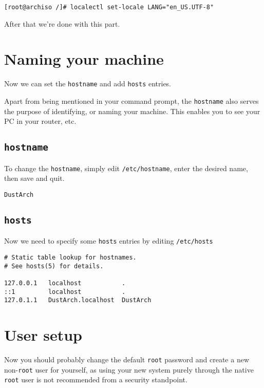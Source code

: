 \documentclass[9pt]{report}
\begin{document}
\begin{verbatim}
[root@archiso /]# localectl set-locale LANG="en_US.UTF-8"
\end{verbatim}

After that we’re done with this part.



\vfill\eject

\hypertarget{x-naming-your-machine}{\section{Naming your machine}}
Now we can set the \texttt{hostname} and add \texttt{hosts} entries.


Apart from being mentioned in your command prompt, the \texttt{hostname} also serves the purpose of identifying, or naming your machine.
This enables you to see your PC in your router, etc.



\vfill\eject

\hypertarget{x-hostname}{\subsection{\texttt{hostname}}}
To change the \texttt{hostname}, simply edit \texttt{/etc/hostname}, enter the desired name, then save and quit.


\begin{verbatim}
DustArch
\end{verbatim}


\vfill\eject

\hypertarget{x-hosts}{\subsection{\texttt{hosts}}}
Now we need to specify some \texttt{hosts} entries by editing \texttt{/etc/hosts}


\begin{verbatim}
# Static table lookup for hostnames.
# See hosts(5) for details.

127.0.0.1   localhost           .
::1         localhost           .
127.0.1.1   DustArch.localhost  DustArch
\end{verbatim}


\vfill\eject

\hypertarget{x-user-setup}{\section{User setup}}
Now you should probably change the default \texttt{root} password and create a new non-\texttt{root} user for yourself, as using your new system purely through the native \texttt{root} user is not recommended from a security standpoint.
\end{document}
